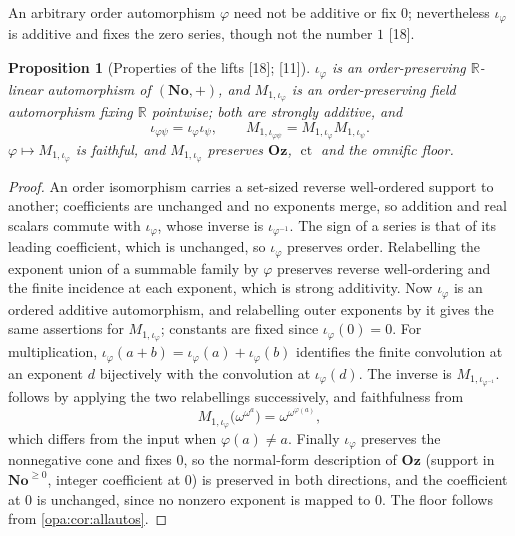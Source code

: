 \documentclass[11pt,oneside]{article}
\numberwithin{equation}{section}
\newtheorem{proposition}[proposition]{Proposition}
\theoremstyle{definition}
\theoremstyle{remark}
\newcommand{\No}{\mathbf{No}}
\newcommand{\Oz}{\mathbf{Oz}}
\newcommand{\R}{\mathbb R}
\newcommand{\ct}{\operatorname{ct}}
\newcommand{\src}[1]{\textup{\textsf{\small[#1]}}}
\begin{document}
An arbitrary order automorphism $\varphi$ need not be additive or fix $0$; nevertheless $\iota_\varphi$ is additive and fixes the zero
series, though not the number $1$ \src{18}.

\begin{proposition}[Properties of the lifts \src{18}; \src{11}]\label{opa:es:prop:lifts}
$\iota_\varphi$ is an order-preserving $\R$-linear automorphism of $(\No,+)$, and $M_{1,\iota_\varphi}$ is an order-preserving field
automorphism fixing $\R$ pointwise; both are strongly additive, and
\begin{equation}\label{opa:es:eq:functor}
 \iota_{\varphi\psi}=\iota_\varphi\iota_\psi,\qquad M_{1,\iota_{\varphi\psi}}=M_{1,\iota_\varphi}M_{1,\iota_\psi}.
\end{equation}
$\varphi\mapsto M_{1,\iota_\varphi}$ is faithful, and $M_{1,\iota_\varphi}$ preserves $\Oz$, $\ct$ and the omnific floor.
\end{proposition}
\begin{proof}
An order isomorphism carries a set-sized reverse well-ordered support to another; coefficients are unchanged and no exponents
merge, so addition and real scalars commute with $\iota_\varphi$, whose inverse is $\iota_{\varphi^{-1}}$. The sign of a series is that of
its leading coefficient, which is unchanged, so $\iota_\varphi$ preserves order. Relabelling the exponent union of a summable family by
$\varphi$ preserves reverse well-ordering and the finite incidence at each exponent, which is strong additivity. Now $\iota_\varphi$ is an
ordered additive automorphism, and relabelling outer exponents by it gives the same assertions for $M_{1,\iota_\varphi}$; constants are
fixed since $\iota_\varphi(0)=0$. For multiplication, $\iota_\varphi(a+b)=\iota_\varphi(a)+\iota_\varphi(b)$ identifies the finite convolution
at an exponent $d$ bijectively with the convolution at $\iota_\varphi(d)$. The inverse is $M_{1,\iota_{\varphi^{-1}}}$.
 follows by applying the two relabellings successively, and faithfulness from
\begin{equation}\label{opa:es:eq:witness}
 M_{1,\iota_\varphi}\bigl(\omega^{\omega^a}\bigr)=\omega^{\omega^{\varphi(a)}},
\end{equation}
which differs from the input when $\varphi(a)\ne a$. Finally $\iota_\varphi$ preserves the nonnegative cone and fixes $0$, so the
normal-form description of $\Oz$ (support in $\No^{\ge0}$, integer coefficient at $0$) is preserved in both directions, and the
coefficient at $0$ is unchanged, since no nonzero exponent is mapped to $0$. The floor follows from \cref{opa:cor:allautos}.
\end{proof}
\end{document}
